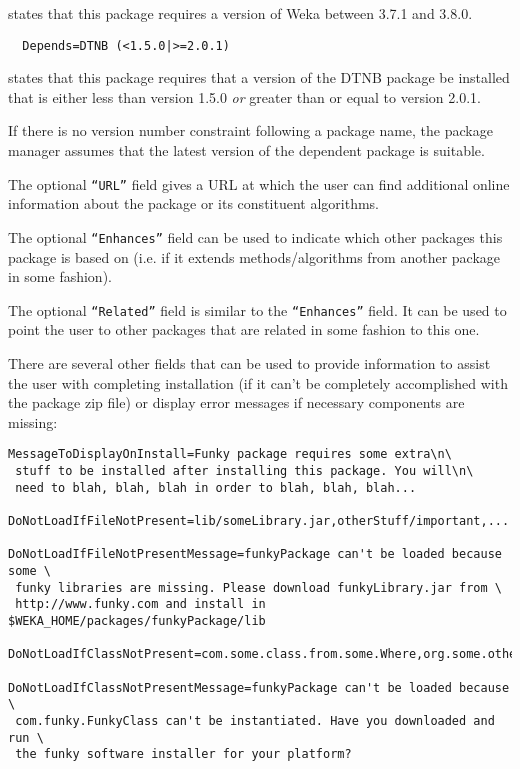 states that this package requires a version of Weka between 3.7.1 and
3.8.0.

\begin{verbatim}
  Depends=DTNB (<1.5.0|>=2.0.1)
\end{verbatim}

states that this package requires that a version of the DTNB package
be installed that is either less than version 1.5.0 \textit{or}
greater than or equal to version 2.0.1.

If there is no version number constraint following a package name, the
package manager assumes that the latest version of the dependent
package is suitable.

The optional \texttt{``URL''} field gives a URL at which the user can
find additional online information about the package or its constituent
algorithms.

The optional \texttt{``Enhances''} field can be used to indicate which
other packages this package is based on (i.e. if it extends
methods/algorithms from another package in some fashion).

The optional \texttt{``Related''} field is similar to the
\texttt{``Enhances''} field. It can be used to point the user to other
packages that are related in some fashion to this one.

There are several other fields that can be used to provide information
to assist the user with completing installation (if it can't be
completely accomplished with the package zip file) or display error
messages if necessary components are missing:

{\scriptsize
\begin{verbatim}
MessageToDisplayOnInstall=Funky package requires some extra\n\
 stuff to be installed after installing this package. You will\n\
 need to blah, blah, blah in order to blah, blah, blah...

DoNotLoadIfFileNotPresent=lib/someLibrary.jar,otherStuff/important,...

DoNotLoadIfFileNotPresentMessage=funkyPackage can't be loaded because some \
 funky libraries are missing. Please download funkyLibrary.jar from \
 http://www.funky.com and install in $WEKA_HOME/packages/funkyPackage/lib

DoNotLoadIfClassNotPresent=com.some.class.from.some.Where,org.some.other.Class,...

DoNotLoadIfClassNotPresentMessage=funkyPackage can't be loaded because \
 com.funky.FunkyClass can't be instantiated. Have you downloaded and run \
 the funky software installer for your platform?
\end{verbatim}}

